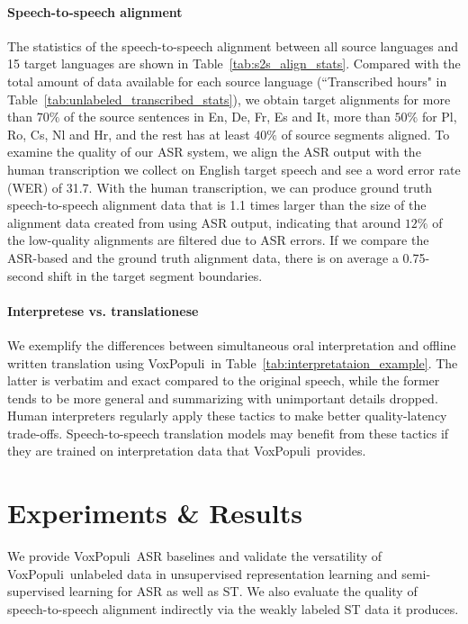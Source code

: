 \documentclass[11pt,a4paper]{article}
\newcommand{\vp}{VoxPopuli}
\begin{document}
\paragraph{Speech-to-speech alignment} The statistics of the speech-to-speech alignment between all source languages and 15 target languages are shown in Table~\ref{tab:s2s_align_stats}. Compared with the total amount of data available for each source language (``Transcribed hours" in Table~\ref{tab:unlabeled_transcribed_stats}), we obtain target alignments for more than $70\%$ of the source sentences in En, De, Fr, Es and It, more than $50\%$ for Pl, Ro, Cs, Nl and Hr, and the rest has at least $40\%$ of source segments aligned. To examine the quality of our ASR system, we align the ASR output with the human transcription we collect on English target speech and see a word error rate (WER) of 31.7. With the human transcription, we can produce ground truth speech-to-speech alignment data that is 1.1 times larger than the size of the alignment data created from using ASR output, indicating that around $12\%$ of the low-quality alignments are filtered due to ASR errors. If we compare the ASR-based and the ground truth alignment data, there is on average a 0.75-second shift in the target segment boundaries.

\paragraph{Interpretese vs. translationese} We exemplify the differences between simultaneous oral interpretation and offline written translation using \vp~in Table~\ref{tab:interpretataion_example}. The latter is verbatim and exact compared to the original speech, while the former tends to be more general and summarizing with unimportant details dropped. Human interpreters regularly apply these tactics to make better quality-latency trade-offs. Speech-to-speech translation models may benefit from these tactics if they are trained on interpretation data that \vp~provides.

\section{Experiments \& Results}
\label{sec:experiments_and_results}
We provide \vp~ASR baselines and validate the versatility of \vp~unlabeled data in unsupervised representation learning and semi-supervised learning for ASR as well as ST. We also evaluate the quality of speech-to-speech alignment indirectly via the weakly labeled ST data it produces.
\end{document}
